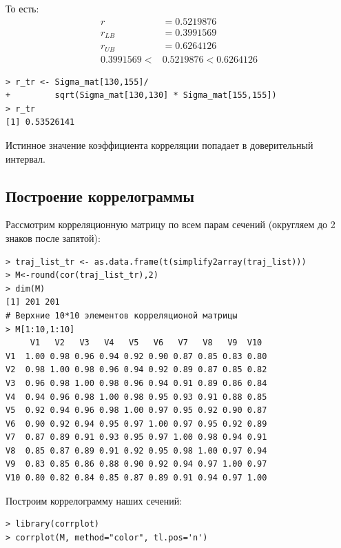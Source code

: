 \documentclass[14pt,a4paper]{scrartcl}
\begin{document}
То есть:
\begin{align*}
	r &= 0.5219876 \\
	r_{LB} &= 0.3991569\\
	r_{UB} &= 0.6264126\\
	0.3991569 < &0.5219876 <0.6264126
\end{align*}

\begin{tcolorbox}[colback=red!5!white,colframe=red!75!black]
\begin{verbatim}
> r_tr <- Sigma_mat[130,155]/
+         sqrt(Sigma_mat[130,130] * Sigma_mat[155,155])
> r_tr
[1] 0.53526141
\end{verbatim}

Истинное значение коэффициента корреляции попадает в доверительный интервал.
\end{tcolorbox}

\pagebreak
\subsection*{Построение коррелограммы}

Рассмотрим корреляционную матрицу по всем парам сечений (округляем до 2 знаков после запятой):

\begin{verbatim}
> traj_list_tr <- as.data.frame(t(simplify2array(traj_list)))
> M<-round(cor(traj_list_tr),2)
> dim(M)
[1] 201 201
# Верхние 10*10 элементов корреляционой матрицы
> M[1:10,1:10]
     V1   V2   V3   V4   V5   V6   V7   V8   V9  V10
V1  1.00 0.98 0.96 0.94 0.92 0.90 0.87 0.85 0.83 0.80
V2  0.98 1.00 0.98 0.96 0.94 0.92 0.89 0.87 0.85 0.82
V3  0.96 0.98 1.00 0.98 0.96 0.94 0.91 0.89 0.86 0.84
V4  0.94 0.96 0.98 1.00 0.98 0.95 0.93 0.91 0.88 0.85
V5  0.92 0.94 0.96 0.98 1.00 0.97 0.95 0.92 0.90 0.87
V6  0.90 0.92 0.94 0.95 0.97 1.00 0.97 0.95 0.92 0.89
V7  0.87 0.89 0.91 0.93 0.95 0.97 1.00 0.98 0.94 0.91
V8  0.85 0.87 0.89 0.91 0.92 0.95 0.98 1.00 0.97 0.94
V9  0.83 0.85 0.86 0.88 0.90 0.92 0.94 0.97 1.00 0.97
V10 0.80 0.82 0.84 0.85 0.87 0.89 0.91 0.94 0.97 1.00
\end{verbatim}

Построим коррелограмму наших сечений:

\begin{verbatim}
> library(corrplot)
> corrplot(M, method="color", tl.pos='n')
\end{verbatim}
\end{document}
